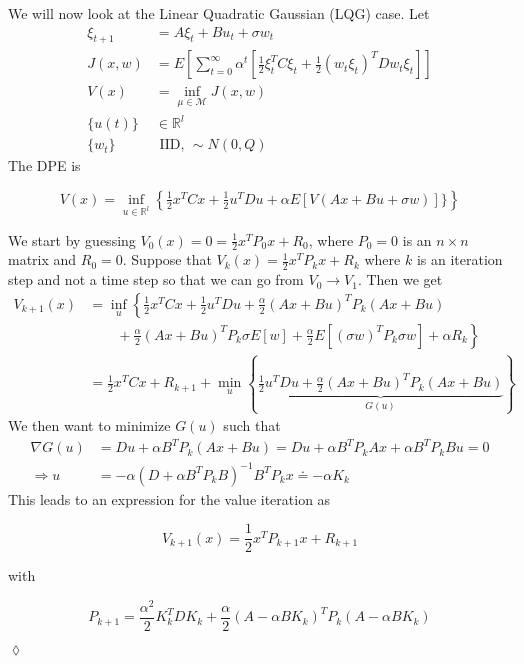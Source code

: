 \begin{example}
We will now look at the Linear Quadratic Gaussian (LQG) case.
Let
\begin{align*}
\xi_{t+1} &= A\xi_t+Bu_t+\sigma w_t \\
J(x,w) &= E\left[\sum_{t=0}^\infty \alpha^t\left[\frac{1}{2}\xi_t^T C\xi_t + \frac{1}{2}{(w_t \xi_t)}^T Dw_t \xi_t\right]\right] \\
V(x) &= \inf_{\mu\in\mathcal{M}}J(x,w) \\
\{u(t)\} &\in\mathbb{R}^l \\
\{w_t\} & \text{~IID,~} \sim N(0,Q)
\end{align*}
The DPE is

\begin{equation*}
V(x) = \inf_{u\in\mathbb{R}^l}\left\lbrace\tfrac{1}{2}x^T Cx + \tfrac{1}{2}u^T Du + \alpha E[V(Ax+Bu+\sigma w)]\}\right\rbrace
\end{equation*}

We start by guessing $V_0(x)=0 = \frac{1}{2}x^T P_0 x+R_0$, where $P_0=0$ is an $n\times n$ matrix and $R_0=0$.
Suppose that $V_k(x) = \frac{1}{2}x^T P_k x+R_k$ where $k$ is an iteration step and not a time step so that we can go from $V_0\to V_1$.
Then we get
\begin{align*}
V_{k+1}(x) &= \inf_u\left\lbrace\frac{1}{2}x^T Cx+\frac{1}{2}u^T Du + \frac{\alpha}{2}{(Ax+Bu)}^T P_k(Ax+Bu) \right.\\
&\left.\qquad + \frac{\alpha}{2}{(Ax+Bu)}^T P_k\sigma E[w] + \frac{\alpha}{2}E[{(\sigma w)}^T P_k \sigma w] + \alpha R_k\right\rbrace \\
&= \frac{1}{2}x^T Cx + R_{k+1} + \min_u\left\lbrace\underbrace{\frac{1}{2}u^T Du + \frac{\alpha}{2}{(Ax+Bu)}^T P_k (Ax+Bu)}_{G(u)}\right\rbrace
\end{align*}
We then want to minimize $G(u)$ such that
\begin{align*}
\nabla G(u) &= Du+\alpha B^T P_k(Ax+Bu) = Du + \alpha B^T P_k Ax + \alpha B^T P_k Bu = 0 \\
\Rightarrow u &= -\alpha{(D+\alpha B^T P_k B)}^{-1}B^T P_k x \doteq -\alpha K_k
\end{align*}
This leads to an expression for the value iteration as

\begin{equation*}
V_{k+1}(x) = \frac{1}{2}x^T P_{k+1}x + R_{k+1}
\end{equation*}

with

\begin{equation*}
P_{k+1} = \frac{\alpha^2}{2}K_k^T DK_k + \frac{\alpha}{2}{(A-\alpha BK_k)}^T P_k(A-\alpha BK_k)
\end{equation*}

$\lozenge$
\end{example}%
